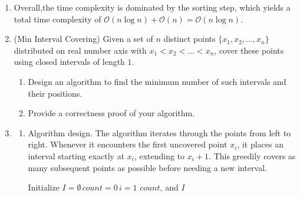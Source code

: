 \documentclass[12pt,a4paper]{article}
\makeatletter
\newtheorem*{solution}{Solution}
\theoremstyle{definition}
\renewenvironment{solution}[1][Solution]
{\par\pushQED{\qed}\normalfont\topsep6\p@\@plus6\p@\relax\trivlist
\item[\hskip\labelsep\bfseries#1\@addpunct{.}]\ignorespaces}{\popQED\endtrivlist\@endpefalse}
\makeatother
\begin{document}
\begin{enumerate}
\begin{solution}
\begin{enumerate}
            Overall,the time complexity is dominated by the sorting step, which yields a total time complexity of $\mathcal{O}(n \log n) + \mathcal{O}(n) = \mathcal{O}(n \log n)$.
    \end{enumerate}
\end{solution}




  \item {\color{purple} (Min Interval Covering)} Given a set of $n$ distinct points $\{x_1, x_2, \dots, x_n\}$ distributed on real number axis with $x_1 < x_2 < \dots < x_n$, cover these points using closed intervals of length $1$.  
\begin{enumerate}
    \item Design an algorithm to find the minimum number of such intervals and their positions.
    \item Provide a correctness proof of your algorithm.
\end{enumerate}

    \begin{solution}
        \begin{enumerate}
            \item Algorithm design.
            The algorithm iterates through the points from left to right. Whenever it encounters the first uncovered point $x_i$, it places an interval starting exactly at $x_i$, extending to $x_i + 1$. This greedily covers as many subsequent points as possible before needing a new interval.

            \begin{minipage}{\linewidth}
                \begin{algorithm}[H]
                \setcounter{AlgoLine}{0}
                \BlankLine
                Initialize $I = \emptyset$\,$count = 0$\,$i = 1$\;
                \Return $count$, and $I$\;
                \caption{Greedy Min Interval Covering}
                \end{algorithm}
            \end{minipage}


\end{enumerate}
\end{solution}
\end{enumerate}
\end{document}
